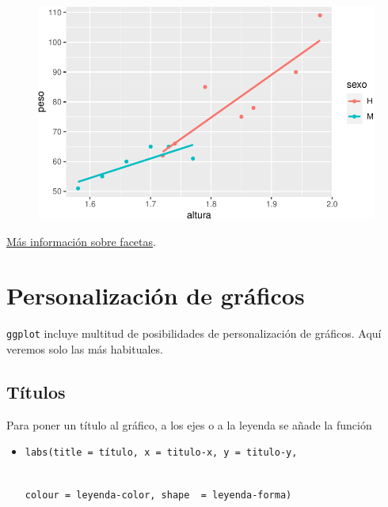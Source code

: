 \documentclass[
  a4paper,
]{scrreport}
\providecommand{\tightlist}{%
  \setlength{\itemsep}{0pt}\setlength{\parskip}{0pt}}\usepackage{longtable,booktabs,array}
\theoremstyle{definition}
\theoremstyle{definition}
\theoremstyle{remark}
\begin{document}
\begin{figure}[H]

{\centering \includegraphics{./07-graficos_files/figure-pdf/unnamed-chunk-26-1.pdf}

}

\end{figure}

\href{https://ggplot2.tidyverse.org/reference/facet_wrap.html?q=facet_wrap}{Más
información sobre facetas}.

\hypertarget{personalizaciuxf3n-de-gruxe1ficos}{%
\section{Personalización de
gráficos}\label{personalizaciuxf3n-de-gruxe1ficos}}

\texttt{ggplot} incluye multitud de posibilidades de personalización de
gráficos. Aquí veremos solo las más habituales.

\hypertarget{tuxedtulos}{%
\subsection{Títulos}\label{tuxedtulos}}

Para poner un título al gráfico, a los ejes o a la leyenda se añade la
función

\begin{itemize}
\tightlist
\item
  \texttt{labs(title\ =\ título,\ x\ =\ titulo-x,\ y\ =\ titulo-y,}\strut \\
  \texttt{colour\ =\ leyenda-color,\ shape\ \ =\ leyenda-forma)}
\end{itemize}
\end{document}
